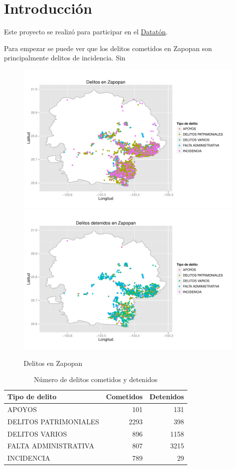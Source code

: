 \newpage
\chapter{Introducción}


\noindent  Este proyecto se realizó para participar en el \href{http://http://dataton.datos.gob.mx}{Datatón}.

Para empezar se puede ver que los delitos cometidos en Zapopan son principalmente delitos de incidencia. Sin 


\begin{figure}[H]
\centering
\caption{Delitos en Zapopan}
\includegraphics[width=120mm]{../../graphs/zapopan_delitos.pdf}
\includegraphics[width=120mm]{../../graphs/zapopan_delitos_detenidos.pdf}
\end{figure}


\begin{table}[H]
\centering
\caption{Número de delitos cometidos y detenidos} 
\begin{tabular}{lrr}
  \hline
Tipo de delito & Cometidos & Detenidos \\ 
  \hline
APOYOS & 101 & 131 \\ 
  DELITOS PATRIMONIALES & 2293 & 398 \\ 
  DELITOS VARIOS & 896 & 1158 \\ 
  FALTA ADMINISTRATIVA & 807 & 3215 \\ 
  INCIDENCIA & 789 &  29 \\ 
   \hline
\end{tabular}
\end{table}

